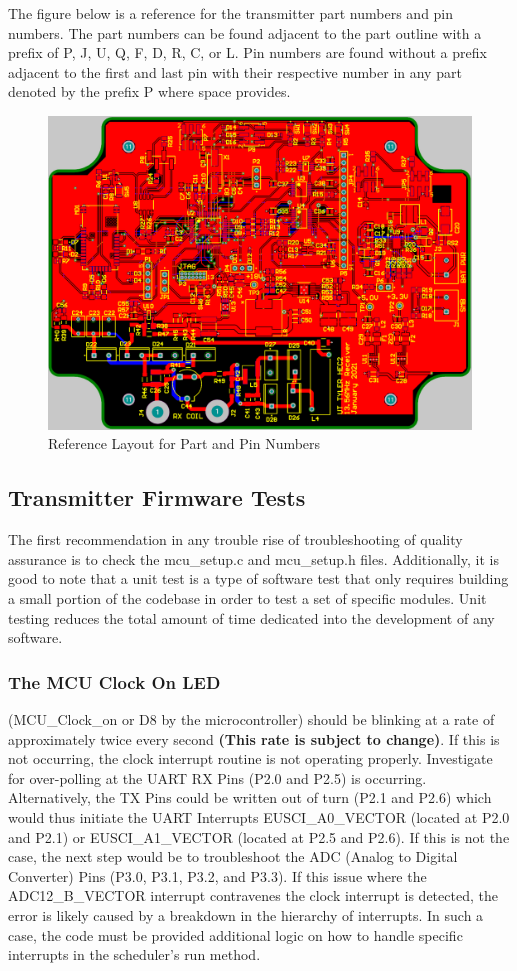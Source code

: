 \documentclass[12pt]{article}
\begin{document}
\noindent
The figure below is a reference for the transmitter part numbers and pin numbers.  The part numbers can be found adjacent to the part outline with a prefix of P, J, U, Q, F, D, R, C, or L.  Pin numbers are found without a prefix adjacent to the first and last pin with their respective number in any part denoted by the prefix P where space provides.
\hfill
\begin{figure}[h!]
\centering
\includegraphics[width=0.8\linewidth]{receiver_pcb_layout}
\caption{Reference Layout for Part and Pin Numbers}
\end{figure}

\hfill
\pagebreak
\hfill 
\subsection{Transmitter Firmware Tests}

\indent
The first recommendation in any trouble rise of troubleshooting of quality assurance is to check the mcu\_setup.c and mcu\_setup.h files.  Additionally, it is good to note that a unit test is a type of software test that only requires building a small portion of the codebase in order to test a set of specific modules.  Unit testing reduces the total amount of time dedicated into the development of any software.

\subsubsection*{The MCU Clock On LED} (MCU\_Clock\_on or D8 by the microcontroller) should be blinking at a rate of approximately twice every second \textbf{(This rate is subject to change)}.  If this is not occurring, the clock interrupt routine is not operating properly.  Investigate for over-polling at the UART RX Pins (P2.0 and P2.5) is occurring.  Alternatively, the TX Pins could be written out of turn (P2.1 and P2.6) which would thus initiate the UART Interrupts EUSCI\_A0\_VECTOR (located at P2.0 and P2.1) or EUSCI\_A1\_VECTOR (located at P2.5 and P2.6).  If this is not the case, the next step would be to troubleshoot the ADC (Analog to Digital Converter) Pins (P3.0, P3.1, P3.2, and P3.3).  If this issue where the ADC12\_B\_VECTOR interrupt contravenes the clock interrupt is detected, the error is likely caused by a breakdown in the hierarchy of interrupts.  In such a case, the code must be provided additional logic on how to handle specific interrupts in the scheduler’s run method.
\end{document}
